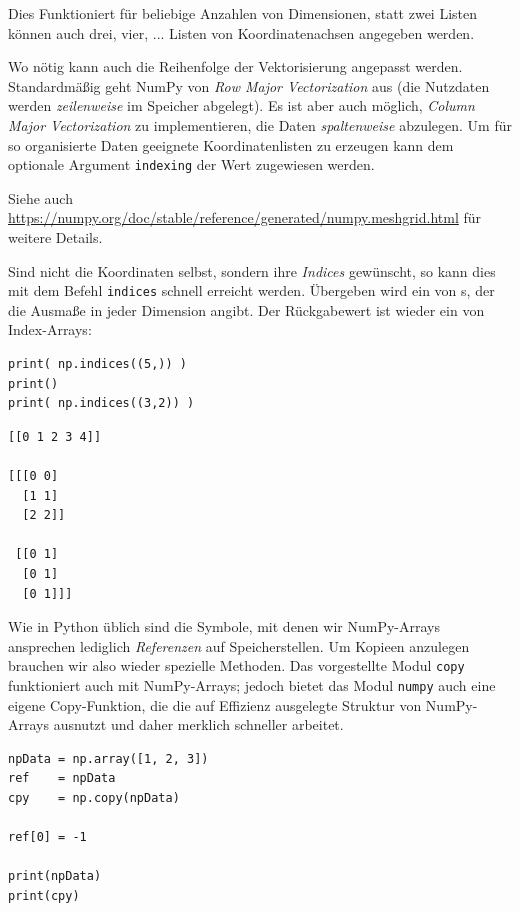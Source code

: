 Dies Funktioniert für beliebige Anzahlen von Dimensionen, \ie statt zwei Listen können auch drei, vier, ... Listen von Koordinatenachsen angegeben werden.

Wo nötig kann auch die Reihenfolge der Vektorisierung angepasst werden. Standardmäßig geht NumPy von \emph{Row Major Vectorization} aus (\ie die Nutzdaten werden \emph{zeilenweise} im Speicher abgelegt). Es ist aber auch möglich, \emph{Column Major Vectorization} zu implementieren, \ie die Daten \emph{spaltenweise} abzulegen. Um für so organisierte Daten geeignete Koordinatenlisten zu erzeugen kann dem optionale Argument \texttt{indexing} der Wert  zugewiesen werden.

Siehe auch \url{https://numpy.org/doc/stable/reference/generated/numpy.meshgrid.html} für weitere Details.

Sind nicht die Koordinaten selbst, sondern ihre \emph{Indices} gewünscht, so kann dies mit dem Befehl \texttt{indices} schnell erreicht werden. Übergeben wird ein  von s, der die Ausmaße in jeder Dimension angibt. Der Rückgabewert ist wieder ein  von Index-Arrays:

\begin{codebox}
\begin{verbatim}
print( np.indices((5,)) )
print()
print( np.indices((3,2)) )
\end{verbatim}
\end{codebox}

\begin{cmdbox}
\begin{verbatim}
[[0 1 2 3 4]]

[[[0 0]
  [1 1]
  [2 2]]

 [[0 1]
  [0 1]
  [0 1]]]
\end{verbatim}
\end{cmdbox}

Wie in Python üblich sind die Symbole, mit denen wir NumPy-Arrays ansprechen lediglich \emph{Referenzen} auf Speicherstellen. Um Kopieen anzulegen brauchen wir also wieder spezielle Methoden. Das vorgestellte Modul \texttt{copy} funktioniert auch mit NumPy-Arrays; jedoch bietet das Modul \texttt{numpy} auch eine eigene Copy-Funktion, die die auf Effizienz ausgelegte Struktur von NumPy-Arrays ausnutzt und daher merklich schneller arbeitet.

\begin{codebox}
\begin{verbatim}
npData = np.array([1, 2, 3])
ref    = npData
cpy    = np.copy(npData)

ref[0] = -1

print(npData)
print(cpy)
\end{verbatim}
\end{codebox}

